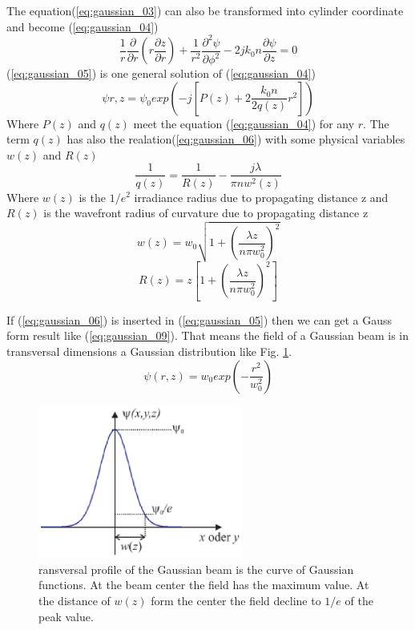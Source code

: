 The equation(\ref{eq:gaussian_03}) can also be transformed into cylinder coordinate and become (\ref{eq:gaussian_04})
\begin{equation}
\frac{1}{r}\frac{\partial}{\partial r}\left(r\frac{\partial z}{\partial r}\right)+\frac{1}{r^2}\frac{ \partial ^{2}\psi}{\partial \phi^2}-2jk_{0}n\frac{\partial\psi}{\partial z}=0
\label{eq:gaussian_04}
\end{equation}
(\ref{eq:gaussian_05}) is one general solution of (\ref{eq:gaussian_04})
\begin{equation}
\psi{r,z}=\psi_{0}exp\left(-j\left[P(z)+2 \frac{ k_{0}n}{2q(z)}r^2\right]\right)
\label{eq:gaussian_05}
\end{equation}
Where $P(z)$ and $q(z)$ meet the equation (\ref{eq:gaussian_04}) for any $r$. The term $q(z)$ has also the realation(\ref{eq:gaussian_06}) with some physical variables $w(z)$ and $R(z)$
\begin{equation}
\frac{1}{q(z)}=\frac{1}{R(z)}-\frac{j\lambda}{\pi nw^{2}(z)}
\label{eq:gaussian_06}
\end{equation}
Where $w(z)$ is the $1/e^2$ irradiance radius due to propagating distance z and $R(z)$ is the wavefront radius of curvature due to propagating distance z
\begin{equation}
w(z)=w_{0}\sqrt{1+(\frac{\lambda z}{n\pi w^{2}_{0}})^{2}}
\label{eq:gaussian_07}
\end{equation}
\begin{equation}
R(z)=z\left[1+(\frac{\lambda z}{n\pi w^{2}_{0}})^{2}\right]
\label{eq:gaussian_08}
\end{equation}

If (\ref{eq:gaussian_06}) is inserted in (\ref{eq:gaussian_05}) then we can get a Gauss form result like (\ref{eq:gaussian_09}). That means the field of a Gaussian beam is in transversal dimensions a Gaussian distribution like Fig. \ref{fig:gaussian_verteilung}.
\begin{equation}
\psi(r,z)=w_{0}exp\left(-\frac{r^2}{w^2_{0}}\right)
\label{eq:gaussian_09}
\end{equation}
\begin{figure}[!ht]
\centering
\includegraphics[width=0.6\textwidth]{bilder/gussian_verteilung}
\caption{ransversal profile of the Gaussian beam is the curve of Gaussian functions. At the beam center the field has the maximum value. At the distance of $w(z)$ form the center the field decline to $1/e$ of the peak value.}
\label{fig:gaussian_verteilung}
\end{figure}

